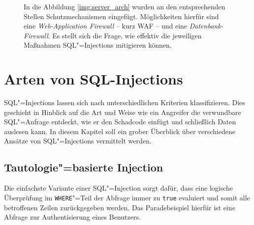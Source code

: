 \begin{figure}
\begin{margincap}
\centering
{}
\caption{In die Abbildung \ref{img:server_arch} wurden an den entsprechenden Stellen Schutzmechanismen eingefügt. Möglichkeiten hierfür sind eine \emph{Web-Application Firewall} -- kurz WAF -- und eine \emph{Datenbank-Firewall}. Es stellt sich die Frage, wie effektiv die jeweiligen Maßnahmen SQL"=Injections mitigieren können.}
\label{img:protected_server_arch}
\end{margincap}
\end{figure}

\chapter{Arten von SQL-Injections}
\lettrine[lines=2]{S}{}QL"=Injections lassen sich nach unterschiedlichen Kriterien klassifizieren. Dies geschieht in Hinblick auf die Art und Weise wie ein Angreifer die verwundbare SQL"=Anfrage entdeckt, wie er den Schadcode einfügt und schließlich Daten auslesen kann. In diesem Kapitel soll ein grober Überblick über verschiedene Ansätze von SQL"=Injections vermittelt werden.

\section{Tautologie"=basierte Injection}

Die einfachste Variante einer SQL"=Injection sorgt dafür, dass eine logische Überprüfung im \texttt{WHERE}"=Teil der Abfrage immer zu \texttt{true} evaluiert und somit alle betroffenen Zeilen zurückgegeben werden. Das Paradebeispiel hierfür ist eine Abfrage zur Authentisierung eines Benutzers.


